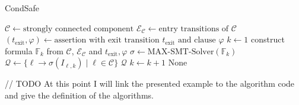 \documentclass[12pt]{scrartcl}
\begin{document}
\begin{algorithm}
\caption{CondSafe}\label{condsafe}
\begin{algorithmic}[1]
\State $\mathcal{C} \gets \text{strongly connected component}$
\State $\mathcal{E}_\mathcal{C} \gets \text{entry transitions of } \mathcal{C}$
\State $(t_\text{exit}, \varphi) \gets \text{assertion with exit transition } t_\text{exit} \text{ and clause } \varphi$
\State $k \gets 1$
\Repeat
  \State construct formula $\mathbb{F}_k$ from $\mathcal{C}$, $\mathcal{E}_\mathcal{C}$ and $t_\text{exit}, \varphi$
  \State $\sigma \gets \text{MAX-SMT-Solver}(\mathbb{F}_k)$
    \State $\mathcal{Q} \gets \lbrace \ell \rightarrow \sigma(I_{\ell, k}) \mid \ell \in \mathcal{C} \rbrace$
    \Return $\mathcal{Q}$
  \EndIf
  \State $k \gets k + 1$
\Return None
\end{algorithmic}
\end{algorithm}

// TODO At this point I will link the presented example to the algorithm code and give the definition of the algorithms.
\end{document}
